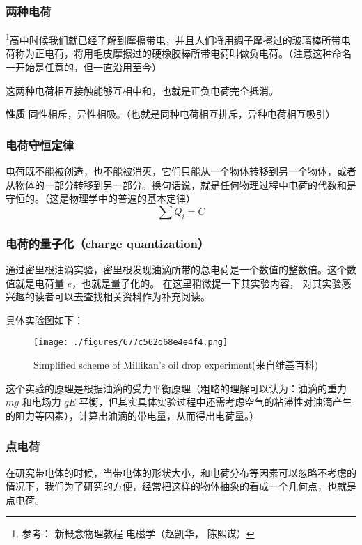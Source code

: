 
\subsubsection{两种电荷}
\footnote{参考： 新概念物理教程 电磁学（赵凯华， 陈熙谋）}高中时候我们就已经了解到摩擦带电，并且人们将用绸子摩擦过的玻璃棒所带电荷称为正电荷，将用毛皮摩擦过的硬橡胶棒所带电荷叫做负电荷。（注意这种命名一开始是任意的，但一直沿用至今）

这两种电荷相互接触能够互相中和，也就是正负电荷完全抵消。

\textbf{性质} 同性相斥，异性相吸。（也就是同种电荷相互排斥，异种电荷相互吸引）

\subsubsection{电荷守恒定律}
电荷既不能被创造，也不能被消灭，它们只能从一个物体转移到另一个物体，或者从物体的一部分转移到另一部分。换句话说，就是任何物理过程中电荷的代数和是守恒的。（这是物理学中的普遍的基本定律）
\begin{equation}
\sum Q_i=C
\end{equation}

\subsubsection{电荷的量子化（charge quantization）}
 通过密里根油滴实验，密里根发现油滴所带的总电荷是一个数值的整数倍。这个数值就是电荷量 $e$，也就是量子化的。
 在这里稍微提一下其实验内容， 对其实验感兴趣的读者可以去查找相关资料作为补充阅读。

具体实验图如下：

\begin{figure}[ht]
\centering
\texttt{[image: ./figures/677c562d68e4e4f4.png]}
\caption{Simplified scheme of Millikan's oil drop experiment(来自维基百科)} \label{fig_EM1_1}
\end{figure}

这个实验的原理是根据油滴的受力平衡原理（粗略的理解可以认为：油滴的重力 $mg$ 和电场力 $qE$ 平衡，但其实具体实验过程中还需考虑空气的粘滞性对油滴产生的阻力等因素），计算出油滴的带电量，从而得出电荷量。）

\subsubsection{点电荷}

在研究带电体的时候，当带电体的形状大小，和电荷分布等因素可以忽略不考虑的情况下，我们为了研究的方便，经常把这样的物体抽象的看成一个几何点，也就是点电荷。

